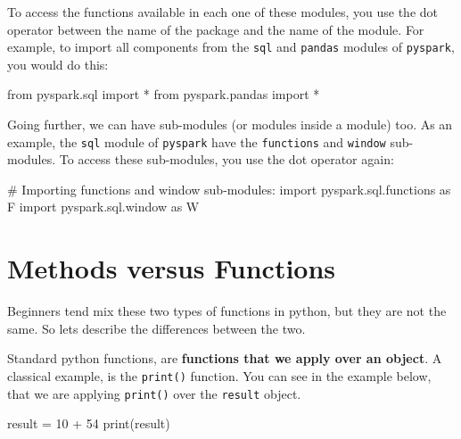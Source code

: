\documentclass[
  11pt,
  letterpaper,
  DIV=11,
  numbers=noendperiod]{scrreprt}
\newenvironment{Shaded}{\begin{snugshade}}{\end{snugshade}}
\newcommand{\BuiltInTok}[1]{\textcolor[rgb]{0.00,0.23,0.31}{#1}}
\newcommand{\CommentTok}[1]{\textcolor[rgb]{0.37,0.37,0.37}{#1}}
\newcommand{\DecValTok}[1]{\textcolor[rgb]{0.68,0.00,0.00}{#1}}
\newcommand{\ImportTok}[1]{\textcolor[rgb]{0.00,0.46,0.62}{#1}}
\newcommand{\NormalTok}[1]{\textcolor[rgb]{0.00,0.23,0.31}{#1}}
\newcommand{\OperatorTok}[1]{\textcolor[rgb]{0.37,0.37,0.37}{#1}}
\begin{document}
To access the functions available in each one of these modules, you use
the dot operator between the name of the package and the name of the
module. For example, to import all components from the \texttt{sql} and
\texttt{pandas} modules of \texttt{pyspark}, you would do this:

\begin{Shaded}
\begin{Highlighting}[]
\ImportTok{from}\NormalTok{ pyspark.sql }\ImportTok{import} \OperatorTok{*}
\ImportTok{from}\NormalTok{ pyspark.pandas }\ImportTok{import} \OperatorTok{*}
\end{Highlighting}
\end{Shaded}

Going further, we can have sub-modules (or modules inside a module) too.
As an example, the \texttt{sql} module of \texttt{pyspark} have the
\texttt{functions} and \texttt{window} sub-modules. To access these
sub-modules, you use the dot operator again:

\begin{Shaded}
\begin{Highlighting}[]
\CommentTok{\# Importing \textasciigrave{}functions\textasciigrave{} and \textasciigrave{}window\textasciigrave{} sub{-}modules:}
\ImportTok{import}\NormalTok{ pyspark.sql.functions }\ImportTok{as}\NormalTok{ F}
\ImportTok{import}\NormalTok{ pyspark.sql.window }\ImportTok{as}\NormalTok{ W}
\end{Highlighting}
\end{Shaded}

\hypertarget{methods-versus-functions}{%
\section{Methods versus Functions}\label{methods-versus-functions}}

Beginners tend mix these two types of functions in python, but they are
not the same. So lets describe the differences between the two.

Standard python functions, are \textbf{functions that we apply over an
object}. A classical example, is the \texttt{print()} function. You can
see in the example below, that we are applying \texttt{print()} over the
\texttt{result} object.

\begin{Shaded}
\begin{Highlighting}[]
\NormalTok{result }\OperatorTok{=} \DecValTok{10} \OperatorTok{+} \DecValTok{54}
\BuiltInTok{print}\NormalTok{(result)}
\end{Highlighting}
\end{Shaded}
\end{document}
